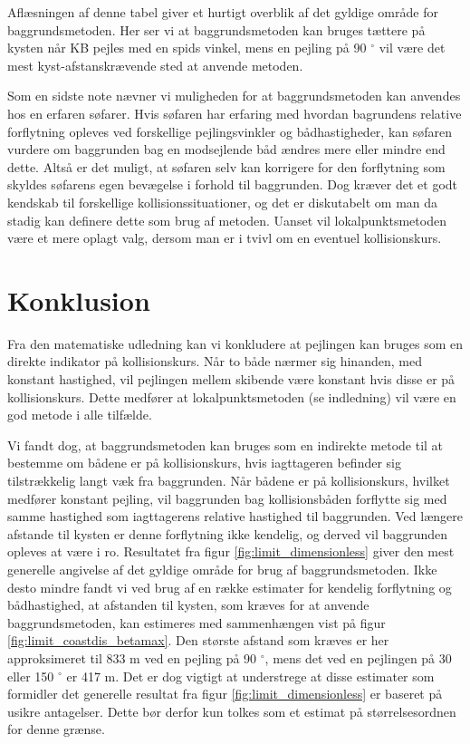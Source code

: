 \documentclass[%
 reprint,
nofootinbib,
aps,
]{revtex4-1}
\begin{document}
Aflæsningen af denne tabel giver et hurtigt overblik af det gyldige område for baggrundsmetoden. Her ser vi at baggrundsmetoden kan bruges tættere på kysten når KB pejles med en spids vinkel, mens en pejling på 90 $^{\circ}$ vil være det mest kyst-afstanskrævende sted at anvende metoden. \par
Som en sidste note nævner vi muligheden for at baggrundsmetoden kan anvendes hos en erfaren søfarer. Hvis søfaren har erfaring med hvordan bagrundens relative forflytning opleves ved forskellige pejlingsvinkler og bådhastigheder, kan søfaren vurdere om baggrunden bag en modsejlende båd ændres mere eller mindre end dette. Altså er det muligt, at søfaren selv kan korrigere for den forflytning som skyldes søfarens egen bevægelse i forhold til baggrunden. Dog kræver det et godt kendskab til forskellige kollisionssituationer, og det er diskutabelt om man da stadig kan definere dette som brug af metoden. Uanset vil lokalpunktsmetoden være et mere oplagt valg, dersom man er i tvivl om en eventuel kollisionskurs.
\linebreak


\newpage

\section{Konklusion}
Fra den matematiske udledning kan vi konkludere at pejlingen kan bruges som en direkte indikator på kollisionskurs. Når to både nærmer sig hinanden, med konstant hastighed, vil pejlingen mellem skibende være konstant hvis disse er på kollisionskurs. Dette medfører at lokalpunktsmetoden (se indledning) vil være en god metode i alle tilfælde. \par
Vi fandt dog, at baggrundsmetoden kan bruges som en indirekte metode til at bestemme om bådene er på kollisionskurs, hvis iagttageren befinder sig tilstrækkelig langt væk fra baggrunden. Når bådene er på kollisionskurs, hvilket medfører konstant pejling, vil baggrunden bag kollisionsbåden forflytte sig med samme hastighed som iagttagerens relative hastighed til baggrunden. Ved længere afstande til kysten er denne forflytning ikke kendelig, og derved vil baggrunden opleves at være i ro. Resultatet fra figur \ref{fig:limit_dimensionless} giver den mest generelle angivelse af det gyldige område for brug af baggrundsmetoden. Ikke desto mindre fandt vi ved brug af en række estimater for kendelig forflytning og bådhastighed, at afstanden til kysten, som kræves for at anvende baggrundsmetoden, kan estimeres med sammenhængen vist på figur \ref{fig:limit_coastdis_betamax}. Den største afstand som kræves er her approksimeret til 833 m ved en pejling på 90 $^{\circ}$, mens det ved en pejlingen på 30 eller 150 $^{\circ}$ er 417 m. Det er dog vigtigt at understrege at disse estimater som formidler det generelle resultat fra figur \ref{fig:limit_dimensionless} er baseret på usikre antagelser. Dette bør derfor kun tolkes som et estimat på størrelsesordnen for denne grænse.
\end{document}
